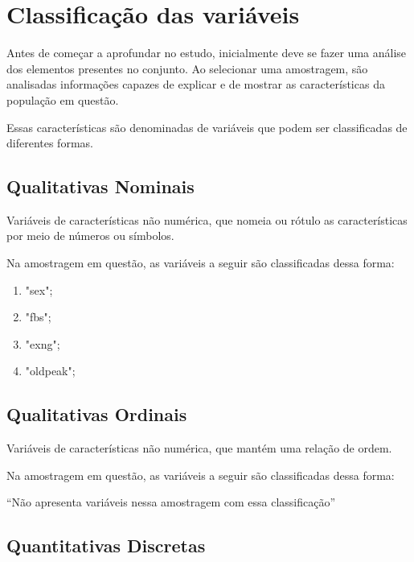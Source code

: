\chapter{Classificação das variáveis}

    \setcounter{section}{0}

    Antes de começar a aprofundar no estudo, inicialmente deve se fazer uma análise dos elementos 
    presentes no conjunto. Ao selecionar uma amostragem, são analisadas informações capazes de explicar 
    e de mostrar as características da população em questão.

    Essas características são denominadas de variáveis que podem ser classificadas de diferentes formas.

    \section{Qualitativas Nominais}

    Variáveis de características não numérica, que nomeia ou rótulo as características por meio de números ou símbolos. 
    
    Na amostragem em questão, as variáveis a seguir são classificadas dessa forma: 

    \begin{enumerate}[label={\alph*)}]
        \addtolength{\itemindent}{1.25cm}
        \item "sex";
        \item "fbs";
        \item "exng";
        \item "oldpeak";
    \end{enumerate}

    \section{Qualitativas Ordinais}

    Variáveis de características não numérica, que mantém uma relação de ordem. 
  
    Na amostragem em questão, as variáveis a seguir são classificadas dessa forma: 

    
    “Não apresenta variáveis nessa amostragem com essa classificação”


    \section{Quantitativas Discretas}

